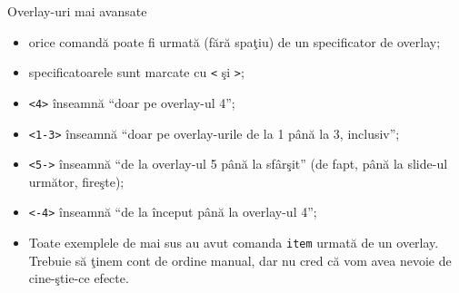 \documentclass{beamer}
\begin{document}
\begin{frame}{Overlay-uri mai avansate}
\begin{itemize}
\item<3-> orice comandă poate fi urmată (fără spaţiu) de un specificator de
overlay;
\item<4-> specificatoarele sunt marcate cu \texttt{<} şi \texttt{>};
\item<5-> \texttt{<4>} înseamnă ``doar pe overlay-ul 4'';
\item<5-> \texttt{<1-3>} înseamnă ``doar pe overlay-urile de la 1 până la 3,
inclusiv'';
\item<6-> \texttt{<5->} înseamnă ``de la overlay-ul 5 până la sfârşit'' (de
fapt, până la slide-ul următor, fireşte);
\item<6-> \texttt{<-4>} înseamnă ``de la început până la overlay-ul 4'';
\item<7-> Toate exemplele de mai sus au avut comanda \texttt{item} urmată de
un overlay. Trebuie să ţinem cont de ordine manual, dar nu cred că vom avea
nevoie de cine-ştie-ce efecte.
\end{itemize}
\end{frame}
\end{document}
